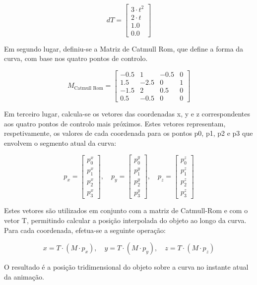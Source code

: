 \documentclass[12pt, a4paper]{article}
\begin{document}
$$
dT = \begin{bmatrix} 3 \cdot t^2 \\ 2 \cdot t \\ 1.0 \\ 0.0 \end{bmatrix}
$$

Em segundo lugar, definiu-se a Matriz de Catmull Rom, que define a forma da curva,
com base nos quatro pontos de controlo.

$$
M_{\text{Catmull Rom}} =
\begin{bmatrix}
    -0.5 & 1   & -0.5 & 0 \\
    1.5  & -2.5 & 0    & 1 \\
    -1.5 & 2   & 0.5  & 0 \\
    0.5  & -0.5 & 0    & 0
\end{bmatrix}
$$

Em terceiro lugar, calcula-se os vetores das coordenadas x, y e z correspondentes
aos quatro pontos de controlo mais próximos. Estes vetores representam, respetivamente,
os valores de cada coordenada para os pontos p0, p1, p2 e p3 que envolvem o
segmento atual da curva:

$$
{p}_x = \begin{bmatrix} p_0^x \\ p_1^x \\ p_2^x \\ p_3^x \end{bmatrix}, \quad
{p}_y = \begin{bmatrix} p_0^y \\ p_1^y \\ p_2^y \\ p_3^y \end{bmatrix}, \quad
{p}_z = \begin{bmatrix} p_0^z \\ p_1^z \\ p_2^z \\ p_3^z \end{bmatrix}
$$

Estes vetores são utilizados em conjunto com a matriz de Catmull-Rom e com o vetor T,
permitindo calcular a posição interpolada do objeto ao longo da curva. Para cada coordenada,
efetua-se a seguinte operação:

$$
x = {T} \cdot ({M} \cdot {p}_x), \quad
y = {T} \cdot ({M} \cdot {p}_y), \quad
z = {T} \cdot ({M} \cdot {p}_z)
$$

O resultado é a posição tridimensional do objeto sobre a curva no instante atual da animação.
\end{document}
